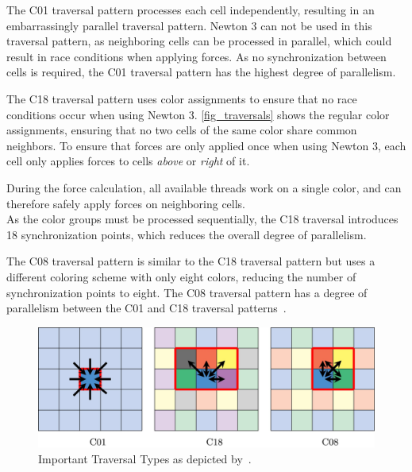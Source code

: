 \documentclass[conference]{IEEEtran}
\begin{document}
\begin{description}[style=nextline]
        \begin{description}[style=nextline, font=\itshape\mdseries]
            \item[$\bullet$ C01]
                The C01 traversal pattern processes each cell independently, resulting in an embarrassingly parallel traversal pattern. Newton 3 can not be used in this traversal pattern, as neighboring cells can be processed in parallel, which could result in race conditions when applying forces. As no synchronization between cells is required, the C01 traversal pattern has the highest degree of parallelism.
            \item[$\bullet$ C18]
                The C18 traversal pattern uses color assignments to ensure that no race conditions occur when using Newton 3. \autoref{fig_traversals} shows the regular color assignments, ensuring that no two cells of the same color share common neighbors. To ensure that forces are only applied once when using Newton 3, each cell only applies forces to cells \textit{above} or \textit{right} of it.

                During the force calculation, all available threads work on a single color, and can therefore safely apply forces on neighboring cells.\\
                As the color groups must be processed sequentially, the C18 traversal introduces 18 synchronization points, which reduces the overall degree of parallelism\cite{NEWCOME2023115278}.

            \item[$\bullet$ C08]
                The C08 traversal pattern is similar to the C18 traversal pattern but uses a different coloring scheme with only eight colors, reducing the number of synchronization points to eight. The C08 traversal pattern has a degree of parallelism between the C01 and C18 traversal patterns~\cite{NEWCOME2023115278}.
        \end{description}

        \begin{figure}[H]
            \centering
            \includegraphics[width=\columnwidth]{figures/traversals.jpg}
            \caption{Important Traversal Types as depicted by~\cite{NEWCOME2023115278}.}
            \label{fig_traversals}
        \end{figure}


\end{description}
\end{document}
